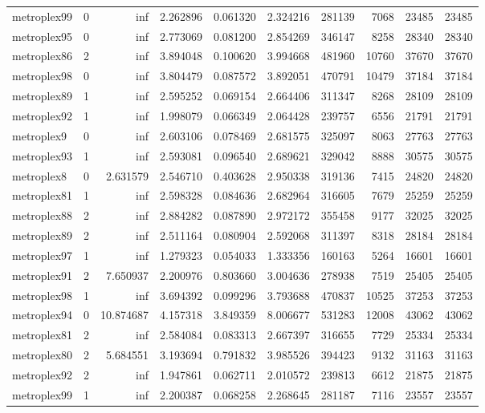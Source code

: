 \begin{longtable}{|l|r|r|r|r|r|r|r|r|r|}
metroplex99 & 0 & inf & 2.262896 & 0.061320 & 2.324216 & 281139 & 7068 & 23485 & 23485 \\
metroplex95 & 0 & inf & 2.773069 & 0.081200 & 2.854269 & 346147 & 8258 & 28340 & 28340 \\
metroplex86 & 2 & inf & 3.894048 & 0.100620 & 3.994668 & 481960 & 10760 & 37670 & 37670 \\
metroplex98 & 0 & inf & 3.804479 & 0.087572 & 3.892051 & 470791 & 10479 & 37184 & 37184 \\
metroplex89 & 1 & inf & 2.595252 & 0.069154 & 2.664406 & 311347 & 8268 & 28109 & 28109 \\
metroplex92 & 1 & inf & 1.998079 & 0.066349 & 2.064428 & 239757 & 6556 & 21791 & 21791 \\
metroplex9 & 0 & inf & 2.603106 & 0.078469 & 2.681575 & 325097 & 8063 & 27763 & 27763 \\
metroplex93 & 1 & inf & 2.593081 & 0.096540 & 2.689621 & 329042 & 8888 & 30575 & 30575 \\
metroplex8 & 0 & 2.631579 & 2.546710 & 0.403628 & 2.950338 & 319136 & 7415 & 24820 & 24820 \\
metroplex81 & 1 & inf & 2.598328 & 0.084636 & 2.682964 & 316605 & 7679 & 25259 & 25259 \\
metroplex88 & 2 & inf & 2.884282 & 0.087890 & 2.972172 & 355458 & 9177 & 32025 & 32025 \\
metroplex89 & 2 & inf & 2.511164 & 0.080904 & 2.592068 & 311397 & 8318 & 28184 & 28184 \\
metroplex97 & 1 & inf & 1.279323 & 0.054033 & 1.333356 & 160163 & 5264 & 16601 & 16601 \\
metroplex91 & 2 & 7.650937 & 2.200976 & 0.803660 & 3.004636 & 278938 & 7519 & 25405 & 25405 \\
metroplex98 & 1 & inf & 3.694392 & 0.099296 & 3.793688 & 470837 & 10525 & 37253 & 37253 \\
metroplex94 & 0 & 10.874687 & 4.157318 & 3.849359 & 8.006677 & 531283 & 12008 & 43062 & 43062 \\
metroplex81 & 2 & inf & 2.584084 & 0.083313 & 2.667397 & 316655 & 7729 & 25334 & 25334 \\
metroplex80 & 2 & 5.684551 & 3.193694 & 0.791832 & 3.985526 & 394423 & 9132 & 31163 & 31163 \\
metroplex92 & 2 & inf & 1.947861 & 0.062711 & 2.010572 & 239813 & 6612 & 21875 & 21875 \\
metroplex99 & 1 & inf & 2.200387 & 0.068258 & 2.268645 & 281187 & 7116 & 23557 & 23557 \\

\end{longtable}
